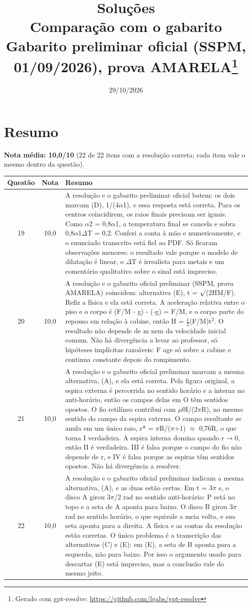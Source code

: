 \documentclass{article}%
\title{Soluções\\[4pt]\large Comparação com o gabarito Gabarito preliminar oficial (SSPM, 01/09/2026), prova AMARELA\thanks{Gerado com gpt-resolve: \url{https://github.com/lgabs/gpt-resolve}}}%
\date{29/10/2026}%
\begin{document}
%
\normalsize%
\maketitle%
\section*{Resumo}\textbf{Nota média: 10,0/10} (22 de 22 itens com a resolução correta; cada item vale o mesmo dentro da questão).\par\medskip%
\begin{longtable}{@{}c c p{}@{}}\toprule Questão & Nota & Resumo \\ \midrule
19 & 10,0 & A resolução e o gabarito preliminar oficial batem: os dois marcam (D), 1/(4$\alpha$1), e essa resposta está correta. Para os centros coincidirem, os raios finais precisam ser iguais. Como $\alpha$2 = 0,8$\alpha$1, a temperatura final se cancela e sobra 0,8$\alpha$1$\Delta$T = 0,2. Conferi a conta à mão e numericamente, e o enunciado transcrito está fiel ao PDF. Só ficaram observações menores: o resultado vale porque o modelo de dilatação é linear, o $\Delta$T é irrealista para metais e um comentário qualitativo sobre o sinal está impreciso. \\
20 & 10,0 & A resolução e o gabarito oficial preliminar (SSPM, prova AMARELA) coincidem: alternativa (E), t = $\surd$(2HM/F). Refiz a física e ela está correta. A aceleração relativa entre o piso e o corpo é (F/M - g) - (-g) = F/M, e o corpo parte do repouso em relação à cabine, então H = $\frac12$(F/M)t$^2$. O resultado não depende de m nem da velocidade inicial comum. Não há divergência a levar ao professor, só hipóteses implícitas razoáveis: F age só sobre a cabine e continua constante depois do rompimento. \\
21 & 10,0 & A resolução e o gabarito oficial preliminar marcam a mesma alternativa, (A), e ela está correta. Pela figura original, a espira externa é percorrida no sentido horário e a interna no anti{-}horário, então os campos delas em O têm sentidos opostos. O fio retilíneo contribui com $\mu$0I/(2$\pi$R), no mesmo sentido do campo da espira externa. O campo resultante se anula em um único raio, r* = $\pi$R/($\pi$+1) $\approx$ 0,76R, o que torna I verdadeira. A espira interna domina quando r$\to$0, então II é verdadeira. III é falsa porque o campo do fio não depende de r, e IV é falsa porque as espiras têm sentidos opostos. Não há divergência a resolver. \\
22 & 10,0 & A resolução e o gabarito oficial preliminar indicam a mesma alternativa, (A), e as duas estão certas. Em t = 3$\pi$ s, o disco A girou 3$\pi$/2 rad no sentido anti{-}horário: P está no topo e a seta de A aponta para baixo. O disco B girou 3$\pi$ rad no sentido horário, o que equivale a meia volta, e sua seta aponta para a direita. A física e as contas da resolução estão corretas. O único problema é a transcrição das alternativas (C) e (E): em (E), a seta de B aponta para a esquerda, não para baixo. Por isso o argumento usado para descartar (E) está impreciso, mas a conclusão vale do mesmo jeito. \\

\end{longtable}
\end{document}

